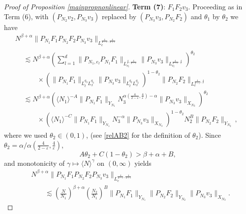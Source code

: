 \documentclass[10pt,leqno]{amsart}
\numberwithin{equation}{section}
\begin{document}
\begin{proof}[Proof of Proposition \ref{mainpropnonlinear}]
\textbf{Term (7)}: $F_1 F_2 v_3$.
Proceeding as in Term (6), with $(P_{N_2}v_2, P_{N_3}v_3)$ replaced by $(P_{N_3}v_3, P_{N_2}F_2)$ and $\theta_1$ by $\theta_2$ we have
\begin{multline*}
N^{\beta +\alpha} \|P_{N_1}F_1  P_{N_2} F_2 P_{N_3} v_3\|_{L^{\frac{4}{4-\varepsilon} ,\frac{4}{2+\varepsilon}}_e}\\
\begin{aligned}
 & \lesssim  N^{\beta +\alpha} \left(\sum_{l=1}^d \|P_{N_1 ,e_l}P_{N_1} F_1\|_{L_{e_l}^{\frac{4}{\varepsilon} ,\frac{4}{2-\varepsilon} }}  \|P_{N_3} v_3\|_{L_{e_l}^{\frac{4}{2-\varepsilon}, \frac{4}{\varepsilon}}} 
 \right)^{\theta_2}  \\
& \qquad \times (\|P_{N_1}F_1\|_{L_t^{q_3}L_x^{ q_3 }} \|P_{N_3}v_3 \|_{L_t^{q_2 }L_x^{q_2} } )^{1-\theta_2}  \|P_{N_2}F_2\|_{L_{e}^{\frac{4}{2-\varepsilon} ,\frac{ 4}{\varepsilon}}} \\
&\lesssim  N^{\beta +\alpha} (\langle N_1 \rangle^{-A} \| P_{N_1}F_1\|_{Y_{N_1}} N_3^{\alpha (\frac{4}{2-\varepsilon} ,\frac{4}{\varepsilon}) -\alpha} \|P_{N_3}v_3\|_{X_{N_3}} )^{\theta_2} \\ 
&\qquad \times (\langle N_1\rangle^{-C}\|P_{N_1} F_1\|_{Y_{N_1}}N_3^{-\alpha} \|P_{N_3}v_3 \|_{X_{N_3}} )^{1-\theta_2}  N_2^{B}\|P_{N_2} F_2\|_{Y_{N_2}} \,,
\end{aligned}
\end{multline*}
where we used $\theta_2 \in (0, 1)$, (see \eqref{relAB2} for the definition of $\theta_2$).
Since $\theta_2 = \alpha/\alpha (\frac{4}{2-\varepsilon} ,\frac{4}{\varepsilon})$,
$$A\theta_2 +C(1-\theta_2 )> \beta +\alpha +B,$$
and monotonicity of $\gamma \mapsto \langle N \rangle^{\gamma}$ on $(0, \infty)$ yields
\begin{align*}
&N^{\beta +\alpha} \|P_{N_1}F_1  P_{N_2} F_2 P_{N_3} v_3\|_{L^{\frac{4}{4-\varepsilon} ,\frac{4}{2+\varepsilon}}_e}\\
&\qquad \lesssim \left(\frac{N}{N_1}\right)^{\beta +\alpha} \left(\frac{N_2 }{N_1}\right)^{B }
 \|P_{N_1}F_1\|_{Y_{N_1}}  \|P_{N_2}F_2\|_{Y_{N_2}}   \|P_{N_3}v_3\|_{X_{N_3}}. 
\end{align*}









\end{proof}
\end{document}
